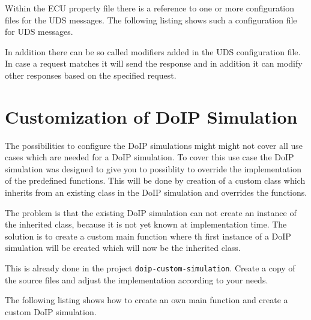 \documentclass[a4paper]{article}
\newcommand{\code}[1]{\texttt{#1}}
\begin{document}
		Within the ECU property file there is a reference to one or more
		configuration files for the UDS messages. The following listing 
		shows such a configuration file for UDS messages.

		

		In addition there can be so called modifiers added in the UDS configuration
		file. In case a request matches it will send the response and in addition
		it can modify other responses based on the specified request.

		

\section{Customization of DoIP Simulation}

		The possibilities to configure the DoIP simulations might might not
		cover all use cases which are needed for a DoIP simulation. To
		cover this use case the DoIP simulation was designed to give you
		to possiblity to override the implementation of the predefined
		functions. This will be done by creation of a custom class which
		inherits from an existing class in the DoIP simulation and overrides
		the functions.

		The problem is that the existing DoIP simulation can not create
		an instance of the inherited class, because it is not yet known 
		at implementation time. The solution is to create a custom
		main function where th first instance of a DoIP simulation will 
		be created which will now be the inherited class. 

		This is already done in the project \code{doip-custom-simulation}.
		Create a copy of the source files and adjust the implementation
		according to your needs.
		
		The following listing shows how to create an own main function
		and create a custom DoIP simulation.

		
		
		

		
\end{document}
